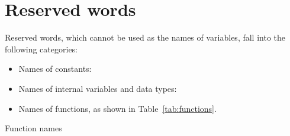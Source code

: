 \chapter{Reserved words}
\label{reswords}

Reserved words, which cannot be used as the names of variables, fall
into the following categories:

\begin{itemize}
\item Names of constants:
  

\item Names of internal variables and data types:
  

\item Names of functions, as shown in Table~\ref{tab:functions}.
\end{itemize}

\begin{table}[htbp]
\caption{Function names}
\label{tab:functions}
\begin{center}

\end{center}
\end{table}
